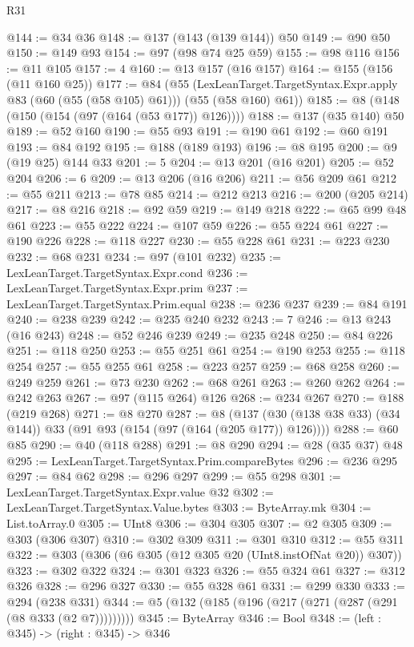 \begin{lexlean}{R31}
\begin{coremodule}
@144 := @34 @36
@148 := @137 (@143 (@139 @144)) @50
@149 := @90 @50
@150 := @149 @93
@154 := @97 (@98 @74 @25 @59)
@155 := @98 @116
@156 := @11 @105
@157 := 4
@160 := @13 @157 (@16 @157)
@164 := @155 (@156 (@11 @160 @25))
@177 := @84
    (@55
      (LexLeanTarget.TargetSyntax.Expr.apply @83 (@60 (@55 (@58 @105) @61)))
      (@55 (@58 @160) @61))
@185 := @8 (@148 (@150 (@154 (@97 (@164 (@53 @177)) @126))))
@188 := @137 (@35 @140) @50
@189 := @52 @160
@190 := @55 @93
@191 := @190 @61
@192 := @60 @191
@193 := @84 @192
@195 := @188 (@189 @193)
@196 := @8 @195
@200 := @9 (@19 @25) @144 @33
@201 := 5
@204 := @13 @201 (@16 @201)
@205 := @52 @204
@206 := 6
@209 := @13 @206 (@16 @206)
@211 := @56 @209 @61
@212 := @55 @211
@213 := @78 @85
@214 := @212 @213
@216 := @200 (@205 @214)
@217 := @8 @216
@218 := @92 @59
@219 := @149 @218
@222 := @65 @99 @48 @61
@223 := @55 @222
@224 := @107 @59
@226 := @55 @224 @61
@227 := @190 @226
@228 := @118 @227
@230 := @55 @228 @61
@231 := @223 @230
@232 := @68 @231
@234 := @97 (@101 @232)
@235 := LexLeanTarget.TargetSyntax.Expr.cond
@236 := LexLeanTarget.TargetSyntax.Expr.prim
@237 := LexLeanTarget.TargetSyntax.Prim.equal
@238 := @236 @237
@239 := @84 @191
@240 := @238 @239
@242 := @235 @240 @232
@243 := 7
@246 := @13 @243 (@16 @243)
@248 := @52 @246 @239
@249 := @235 @248
@250 := @84 @226
@251 := @118 @250
@253 := @55 @251 @61
@254 := @190 @253
@255 := @118 @254
@257 := @55 @255 @61
@258 := @223 @257
@259 := @68 @258
@260 := @249 @259
@261 := @73 @230
@262 := @68 @261
@263 := @260 @262
@264 := @242 @263
@267 := @97 (@115 @264) @126
@268 := @234 @267
@270 := @188 (@219 @268)
@271 := @8 @270
@287 := @8 (@137 (@30 (@138 @38 @33) (@34 @144)) @33 (@91 @93 (@154 (@97 (@164 (@205 @177)) @126))))
@288 := @60 @85
@290 := @40 (@118 @288)
@291 := @8 @290
@294 := @28 (@35 @37) @48
@295 := LexLeanTarget.TargetSyntax.Prim.compareBytes
@296 := @236 @295
@297 := @84 @62
@298 := @296 @297
@299 := @55 @298
@301 := LexLeanTarget.TargetSyntax.Expr.value @32
@302 := LexLeanTarget.TargetSyntax.Value.bytes
@303 := ByteArray.mk
@304 := List.toArray.{0}
@305 := UInt8
@306 := @304 @305
@307 := @2 @305
@309 := @303 (@306 @307)
@310 := @302 @309
@311 := @301 @310
@312 := @55 @311
@322 := @303 (@306 (@6 @305 (@12 @305 @20 (UInt8.instOfNat @20)) @307))
@323 := @302 @322
@324 := @301 @323
@326 := @55 @324 @61
@327 := @312 @326
@328 := @296 @327
@330 := @55 @328 @61
@331 := @299 @330
@333 := @294 (@238 @331)
@344 := @5 (@132 (@185 (@196 (@217 (@271 (@287 (@291 (@8 @333 (@2 @7)))))))))
@345 := ByteArray
@346 := Bool
@348 := (left : @345) -> (right : @345) -> @346

\end{coremodule}
\end{lexlean}
